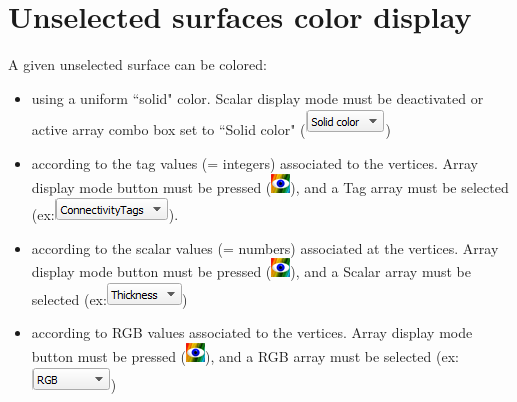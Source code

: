 \section{Unselected surfaces  color display}
 A given unselected surface can be colored: 
\begin{itemize}
\item using a uniform ``solid" color. Scalar display mode must be deactivated or active array combo box set to ``Solid color" (\includegraphics[scale=0.5]{images/04/scalarcombo_solidcolor.png})
\item according to the tag values (= integers) associated to the vertices. Array display mode button must be pressed (\includegraphics[scale=0.7]{images/04/show_color_scale.png}), and a Tag array must be selected (ex:\includegraphics[scale=0.5]{images/04/scalarcombo_tag.png}).
\item	according to the scalar values (= numbers) associated at the vertices. Array display mode button must be pressed (\includegraphics[scale=0.7]{images/04/show_color_scale.png}), and a Scalar array must be selected (ex:\includegraphics[scale=0.5]{images/04/scalarcombo_scalar.png})
\item	according to RGB values associated to the vertices. Array display mode button must be pressed (\includegraphics[scale=0.7]{images/04/show_color_scale.png}), and a RGB array must be selected (ex:\includegraphics[scale=0.5]{images/04/scalarcombo_rgb.png}) 
\end{itemize}